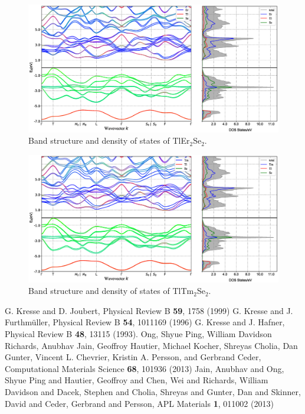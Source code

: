 \documentclass[onecolumn]{revtex4}
\begin{document}
\begin{figure}[ht]
	\centering
\includegraphics[scale=0.4]{img/Er_BAND+DOS}
	\caption{Band structure and density of states of TlEr$_2$Se$_2$. }
\end{figure}	
\begin{figure}[ht]
	\centering
	\includegraphics[scale=0.4]{img/Tm_BAND+DOS}
	\caption{Band structure and density of states of TlTm$_2$Se$_2$. }
\end{figure}
%
%

\begin{thebibliography}{99}
 G. Kresse and D. Joubert, Physical Review B \textbf{59}, 1758 (1999)
G. Kresse and J. Furthm\"{u}ller, Physical Review B  \textbf{54}, 1011169 (1996)
G. Kresse and J. Hafner, Physical Review B \textbf{48}, 13115 (1993).
 Ong, Shyue Ping, William Davidson Richards, Anubhav Jain, Geoffroy Hautier, Michael Kocher, Shreyas Cholia, Dan Gunter, Vincent L. Chevrier, Kristin A. Persson, and Gerbrand Ceder, Computational Materials Science \textbf{68}, 101936 (2013)
 Jain, Anubhav and Ong, Shyue Ping and Hautier, Geoffroy and Chen, Wei and Richards, William Davidson and Dacek, Stephen and Cholia, Shreyas and Gunter, Dan and Skinner, David and Ceder, Gerbrand and Persson, APL Materials \textbf{1}, 011002 (2013)
\end{thebibliography}
\end{document}
